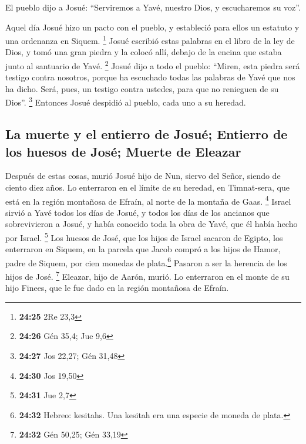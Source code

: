  El pueblo dijo a Josué: ``Serviremos a Yavé, nuestro
Dios, y escucharemos su voz''.

 Aquel día Josué hizo un pacto con el pueblo, y
estableció para ellos un estatuto y una ordenanza en Siquem. \footnote{\textbf{24:25}
  2Re 23,3}  Josué escribió estas palabras en el libro de
la ley de Dios, y tomó una gran piedra y la colocó allí, debajo de la
encina que estaba junto al santuario de Yavé. \footnote{\textbf{24:26}
  Gén 35,4; Jue 9,6}  Josué dijo a todo el pueblo:
``Miren, esta piedra será testigo contra nosotros, porque ha escuchado
todas las palabras de Yavé que nos ha dicho. Será, pues, un testigo
contra ustedes, para que no renieguen de su Dios''. \footnote{\textbf{24:27}
  Jos 22,27; Gén 31,48}  Entonces Josué despidió al
pueblo, cada uno a su heredad.

\hypertarget{la-muerte-y-el-entierro-de-josuuxe9-entierro-de-los-huesos-de-josuxe9-muerte-de-eleazar}{%
\subsection{La muerte y el entierro de Josué; Entierro de los huesos de
José; Muerte de
Eleazar}\label{la-muerte-y-el-entierro-de-josuuxe9-entierro-de-los-huesos-de-josuxe9-muerte-de-eleazar}}

 Después de estas cosas, murió Josué hijo de Nun, siervo
del Señor, siendo de ciento diez años.  Lo enterraron en
el límite de su heredad, en Timnat-sera, que está en la región montañosa
de Efraín, al norte de la montaña de Gaas. \footnote{\textbf{24:30} Jos
  19,50}  Israel sirvió a Yavé todos los días de Josué, y
todos los días de los ancianos que sobrevivieron a Josué, y había
conocido toda la obra de Yavé, que él había hecho por Israel.
\footnote{\textbf{24:31} Jue 2,7}  Los huesos de José,
que los hijos de Israel sacaron de Egipto, los enterraron en Siquem, en
la parcela que Jacob compró a los hijos de Hamor, padre de Siquem, por
cien monedas de plata.\footnote{\textbf{24:32} Hebreo: kesitahs. Una
  kesitah era una especie de moneda de plata.} Pasaron a ser la herencia
de los hijos de José. \footnote{\textbf{24:32} Gén 50,25; Gén 33,19}
 Eleazar, hijo de Aarón, murió. Lo enterraron en el monte
de su hijo Finees, que le fue dado en la región montañosa de Efraín.
